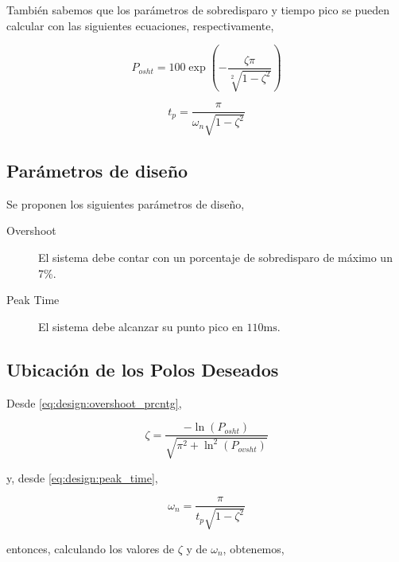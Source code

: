 \documentclass[12pt,a4paper]{article}
\begin{document}
        También sabemos que los parámetros de sobredisparo y tiempo pico se pueden calcular con las siguientes ecuaciones, 
        respectivamente, 

        \begin{equation}
          P_{osht} = 100\exp\left(-\frac{\zeta\pi}{\sqrt[2]{1-\zeta^{2}}}\right)
          \label{eq:design:overshoot_prcntg}
        \end{equation}

        \begin{equation}
          t_{p} = \frac{\pi}{\omega_{n}\sqrt{1-\zeta^{2}}}
          \label{eq:design:peak_time}
        \end{equation}

      \subsection{Parámetros de diseño}

        Se proponen los siguientes parámetros de diseño,

        \begin{description}
          \item[Overshoot] El sistema debe contar con un porcentaje de sobredisparo de máximo un 7\%. 
          \item[Peak Time] El sistema debe alcanzar su punto pico en $ 110\si{\milli\second} $. 
        \end{description}
      
      \subsection{Ubicación de los Polos Deseados}

        Desde \ref{eq:design:overshoot_prcntg}, 

        \begin{equation}
          \zeta = \frac{-\ln\left(P_{osht}\right)}{\sqrt{\pi^{2} + \ln^{2}\left(P_{ovsht}\right)}}
        \end{equation}

        y, desde \ref{eq:design:peak_time}, 

        \begin{equation}
          \omega_{n} = \frac{\pi}{t_{p}\sqrt{1-\zeta^{2}}}
        \end{equation}
        
        entonces, calculando los valores de \( \zeta \)  y de \( \omega_{n} \), obtenemos, 
\end{document}
